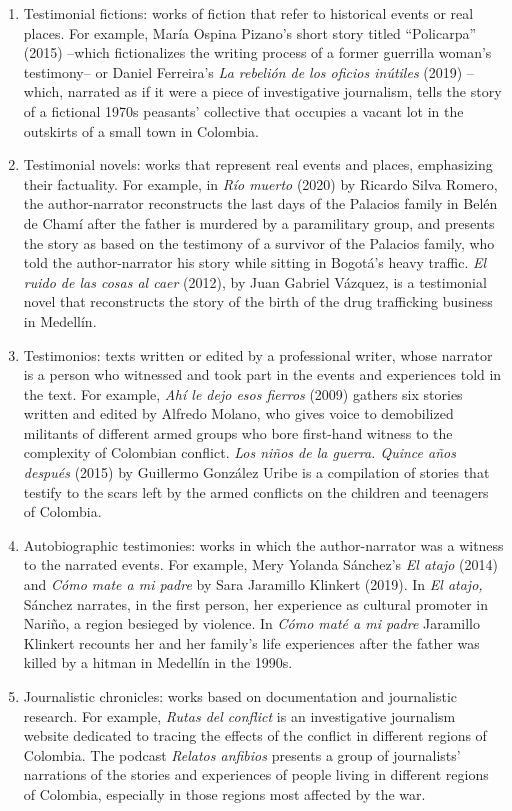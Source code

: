 \documentclass[
  11pt,
,
onecolumn,
openany
]{book}
\begin{document}
\begin{enumerate}
\def\labelenumi{\arabic{enumi}.}
\item
  Testimonial fictions: works of fiction that refer to historical events or
  real places. For example, María Ospina Pizano's short story titled
  ``Policarpa'' (2015) --which fictionalizes the writing process of a former
  guerrilla woman's testimony-- or Daniel Ferreira's \emph{La rebelión de los
  oficios inútiles} (2019) --which, narrated as if it were a piece of
  investigative journalism, tells the story of a fictional 1970s peasants'
  collective that occupies a vacant lot in the outskirts of a small town in
  Colombia.
\item
  Testimonial novels: works that represent real events and places, emphasizing
  their factuality. For example, in \emph{Río muerto} (2020) by Ricardo Silva
  Romero, the author-narrator reconstructs the last days of the Palacios
  family in Belén de Chamí after the father is murdered by a paramilitary
  group, and presents the story as based on the testimony of a survivor of the
  Palacios family, who told the author-narrator his story while sitting in
  Bogotá's heavy traffic. \emph{El ruido de las cosas al caer} (2012), by Juan
  Gabriel Vázquez, is a testimonial novel that reconstructs the story of the
  birth of the drug trafficking business in Medellín.
\item
  Testimonios: texts written or edited by a professional writer, whose
  narrator is a person who witnessed and took part in the events and
  experiences told in the text. For example, \emph{Ahí le dejo esos fierros}
  (2009) gathers six stories written and edited by Alfredo Molano, who gives
  voice to demobilized militants of different armed groups who bore first-hand
  witness to the complexity of Colombian conflict. \emph{Los niños de la
  guerra. Quince años después} (2015) by Guillermo González Uribe is a
  compilation of stories that testify to the scars left by the armed conflicts
  on the children and teenagers of Colombia.
\item
  Autobiographic testimonies: works in which the author-narrator was a witness
  to the narrated events. For example, Mery Yolanda Sánchez's \emph{El atajo}
  (2014) and \emph{Cómo mate a mi padre} by Sara Jaramillo Klinkert (2019). In
  \emph{El atajo,} Sánchez narrates, in the first person, her experience as
  cultural promoter in Nariño, a region besieged by violence. In \emph{Cómo
  maté a mi padre} Jaramillo Klinkert recounts her and her family's life
  experiences after the father was killed by a hitman in Medellín in the
  1990s.
\item
  Journalistic chronicles: works based on documentation and journalistic
  research. For example, \emph{Rutas del conflict} is an investigative
  journalism website dedicated to tracing the effects of the conflict in
  different regions of Colombia. The podcast \emph{Relatos anfibios} presents
  a group of journalists' narrations of the stories and experiences of people
  living in different regions of Colombia, especially in those regions most
  affected by the war.
\end{enumerate}
\end{document}
